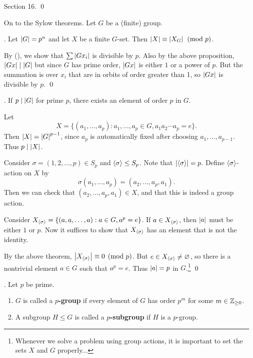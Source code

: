 \pf Section 16. \qed

\bigskip

On to the Sylow theorems. Let \(G\) be a (finite) group.

\thm. Let \(\left| G \right| = p^n\) and let \(X\) be a finite \(G\)-set. Then \(\left| X \right| \equiv \left| X_G \right| \pmod p\).

\pf By (\mast), we show that \(\sum \left| G x_i \right|\) is divisible by \(p\). Also by the above proposition, \(\left| Gx \right| \mid \left| G \right|\) but since \(G\) has prime order, \(\left| Gx \right|\) is either \(1\) or a power of \(p\). But the summation is over \(x_i\) that are in orbits of order greater than 1, so \(\left| Gx \right|\) is divisible by \(p\). \qed

\pagebreak

\thm.  If \(p \mid \left| G \right|\) for prime \(p\), there exists an element of order \(p\) in \(G\).

\pf Let
\[
    X = \{(a_1, \dots, a_p) : a_1, \dots, a_p \in G, a_1a_2\cdots a_p = e\}.
\]
Then \(\left| X \right| = \left| G \right|^{p-1}\), since \(a_p\) is automatically fixed after choosing \(a_1, \dots, a_{p-1}\). Thus \(p \mid \left| X \right|\).

Consider \(\sigma = (1, 2, \dots, p) \in S_p\) and \(\left\langle \sigma \right\rangle \leq S_p\). Note that \(\left| \left\langle \sigma \right\rangle \right| = p\). Define \(\left\langle \sigma \right\rangle\)-action on \(X\) by
\[
    \sigma(a_1, \dots, a_p) = (a_2, \dots, a_p, a_1).
\]
Then we can check that \((a_2, \dots, a_p, a_1) \in X\), and that this is indeed a group action.

Consider \(X_{\left\langle \sigma \right\rangle} = \{(a, a, \dots, a) : a \in G, a^p = e\}\). If \(a \in X_{\left\langle \sigma \right\rangle}\), then \(\left| a \right|\) must be either \(1\) or \(p\). Now it suffices to show that \(X_{\left\langle \sigma \right\rangle}\) has an element that is not the identity.

By the above theorem, \(\left| X_{\left\langle \sigma \right\rangle} \right| \equiv 0 \pmod p\). But \(e \in X_{\left\langle \sigma \right\rangle} \neq \varnothing\), so there is a nontrivial element \(a \in G\) such that \(a^p = e\). Thus \(\left| a \right| = p\) in \(G\).\footnote{Whenever we solve a problem using group actions, it is important to set the sets \(X\) and \(G\) properly...} \qed

.  Let \(p\) be prime.
\begin{enumerate}
    \item \(G\) is called a \textbf{\(p\)-group} if every element of \(G\) has order \(p^m\) for some \(m \in \mathbb{Z}_{\geq 0}\).
    \item A subgroup \(H \leq G\) is called a \textbf{\(p\)-subgroup} if \(H\) is a \(p\)-group.
\end{enumerate}

